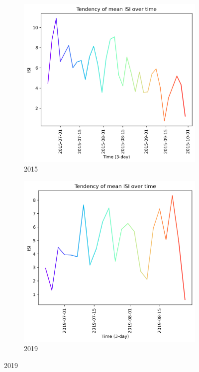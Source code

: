 \begin{figure}[h]
	\caption{ISI mean tendency graph}
	\centering
	\begin{subfigure}{0.49\textwidth}
		\centering
		\includegraphics[width=\textwidth]{graphs/all_time/2015_tendency_graph_ISI.png}
		\caption{2015}
		\label{fig:mean_tendency_isi_2015}
	\end{subfigure}
	\hfill
	\begin{subfigure}{0.49\textwidth}
		\centering
		\includegraphics[width=\textwidth]{graphs/all_time/2019_tendency_graph_ISI.png}
		\caption{2019}
		\label{fig:mean_tendency_isi_2019}
	\end{subfigure}
	\label{fig:mean_tendency_isi}
\end{figure}


